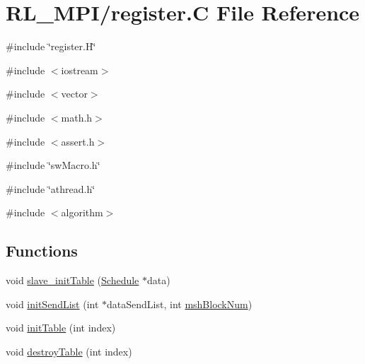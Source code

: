 \hypertarget{register_8C}{
\section{RL\_\-MPI/register.C File Reference}
\label{register_8C}
}
{\ttfamily \#include \char`\"{}register.H\char`\"{}}\par
{\ttfamily \#include $<$iostream$>$}\par
{\ttfamily \#include $<$vector$>$}\par
{\ttfamily \#include $<$math.h$>$}\par
{\ttfamily \#include $<$assert.h$>$}\par
{\ttfamily \#include \char`\"{}swMacro.h\char`\"{}}\par
{\ttfamily \#include \char`\"{}athread.h\char`\"{}}\par
{\ttfamily \#include $<$algorithm$>$}\par
\subsection*{Functions}
\begin{DoxyCompactItemize}
\item 
void \hyperlink{register_8C_af2778897e39d6df9bd4aa5d53c3cda1c}{slave\_\-initTable} (\hyperlink{structSchedule}{Schedule} $\ast$data)
\item 
void \hyperlink{register_8C_a4e113cf30f6198d50fb212074effcc61}{initSendList} (int $\ast$dataSendList, int \hyperlink{edge2VertexIter__host_8c_ab5823517d185e26f48dc14ee05b60877}{mshBlockNum})
\item 
void \hyperlink{register_8C_a14fad51cfceca5a582218c98bdb3d769}{initTable} (int index)
\item 
void \hyperlink{register_8C_a099f07ebad307cc1509766f32cfcba5f}{destroyTable} (int index)
\end{DoxyCompactItemize}


